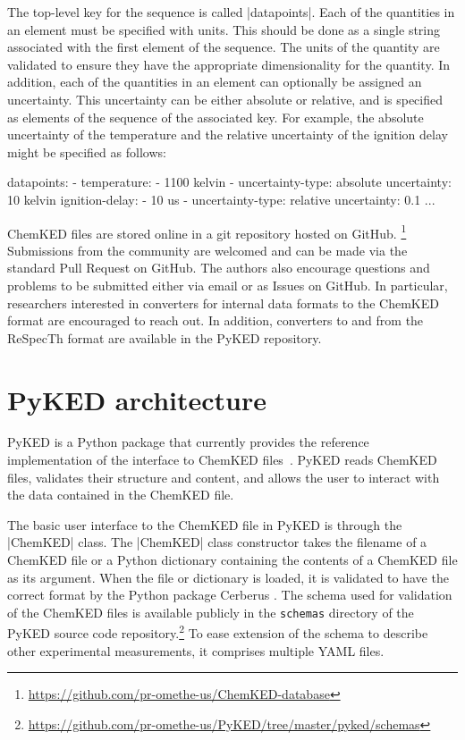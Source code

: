 \documentclass[12pt]{ijck}
\newcommand\ck{ChemKED}
\newcommand\pk{PyKED}
\begin{document}
The top-level key for the sequence is called \yabox|datapoints|. Each of the
quantities in an element must be specified with units. This should be done as a
single string associated with the first element of the sequence. The units of
the quantity are validated to ensure they have the appropriate dimensionality
for the quantity. In addition, each of the quantities in an element can
optionally be assigned an uncertainty. This uncertainty can be either absolute
or relative, and is specified as elements of the sequence of the associated key.
For example, the absolute uncertainty of the temperature and the relative
uncertainty of the ignition delay might be specified as follows:

\begin{yamlbox}
datapoints:
  - temperature:
      - 1100 kelvin
      - uncertainty-type: absolute
        uncertainty: 10 kelvin
    ignition-delay:
      - 10 us
      - uncertainty-type: relative
        uncertainty: 0.1
    ...
\end{yamlbox}

ChemKED files are stored online in a git repository hosted on GitHub.
\footnote{\url{https://github.com/pr-omethe-us/ChemKED-database}}
Submissions from the community are welcomed and can be made via the standard Pull Request
on GitHub. The authors also encourage questions and problems to be submitted either via
email or as Issues on GitHub. In particular, researchers interested in converters for
internal data formats to the ChemKED format are encouraged to reach out. In addition,
converters to and from the ReSpecTh format are available in the PyKED repository.

\section{PyKED architecture}\label{sec:pyked-architecture}
%
\pk{} is a Python package that currently provides the reference implementation
of the interface to \ck{} files~\autocite{PyKED}. \pk{} reads \ck{} files, validates
their structure and content, and allows the user to interact with the data contained
in the \ck{} file.

The basic user interface to the \ck{} file in \pk{} is through the
\pybox|ChemKED| class. The \pybox|ChemKED| class constructor takes the filename
of a \ck{} file or a Python dictionary containing the contents of a \ck{} file
as its argument. When the file or dictionary is loaded, it is validated to have
the correct format by the Python package Cerberus \autocite{cerberus}. The
schema used for validation of the \ck{} files is available publicly in the
\texttt{schemas} directory of the PyKED source code
repository.\footnote{\url{https://github.com/pr-omethe-us/PyKED/tree/master/pyked/schemas}}
To ease extension of the schema to describe other experimental measurements, it
comprises multiple YAML files.
\end{document}
